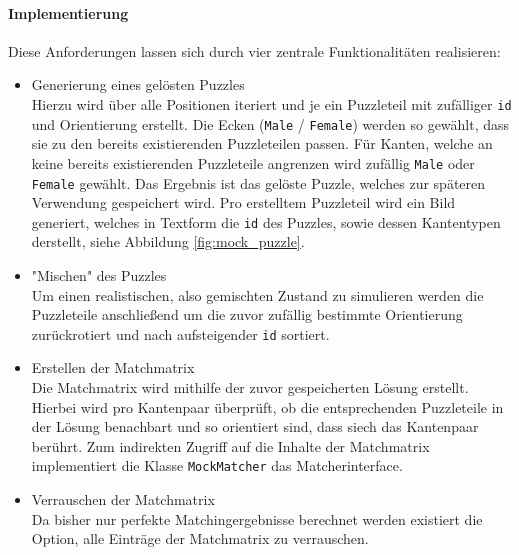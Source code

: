 \paragraph{Implementierung}
Diese Anforderungen lassen sich durch vier zentrale Funktionalitäten realisieren:
\begin{itemize}
    \item Generierung eines gelösten Puzzles\\
        Hierzu wird über alle Positionen iteriert und je ein Puzzleteil mit zufälliger \verb|id| und Orientierung erstellt.
        Die Ecken (\verb|Male| / \verb|Female|) werden so gewählt, dass sie zu den bereits existierenden Puzzleteilen passen. Für Kanten, welche an keine bereits existierenden Puzzleteile angrenzen wird zufällig \verb|Male| oder \verb|Female| gewählt.
        Das Ergebnis ist das gelöste Puzzle, welches zur späteren Verwendung gespeichert wird. Pro erstelltem Puzzleteil wird ein Bild generiert, welches in Textform die \verb|id| des Puzzles, sowie dessen Kantentypen derstellt, siehe Abbildung \ref{fig:mock_puzzle}.
    \item "Mischen" des Puzzles\\
        Um einen realistischen, also gemischten Zustand zu simulieren werden die Puzzleteile anschließend um die zuvor zufällig bestimmte Orientierung zurückrotiert und nach aufsteigender \verb|id| sortiert.
    \item Erstellen der Matchmatrix\\
        Die Matchmatrix wird mithilfe der zuvor gespeicherten Lösung erstellt. Hierbei wird pro Kantenpaar überprüft, ob die entsprechenden Puzzleteile in der Lösung benachbart und so orientiert sind, dass siech das Kantenpaar berührt.
        Zum indirekten Zugriff auf die Inhalte der Matchmatrix implementiert die Klasse \verb|MockMatcher| das Matcherinterface.
    \item Verrauschen der Matchmatrix\\
        Da bisher nur perfekte Matchingergebnisse berechnet werden existiert die Option, alle Einträge der Matchmatrix zu verrauschen.


\end{itemize}
